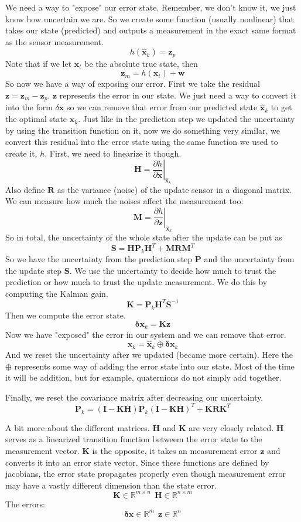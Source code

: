 \documentclass[11pt]{article}
\newcommand{\R}{\mathbb{R}}
\renewcommand{\vec}[1]{\mathbf{#1}}
\renewcommand{\tilde}[1]{\expandafter\hat{#1}}
\newcommand{\mat}[1]{\mathbf{#1}}
\begin{document}
We need a way to "expose" our error state. Remember, we don't know it, we just know how uncertain we are. So we create some function (usually nonlinear) that takes our state (predicted) and outputs a measurement in the exact same format as the sensor measurement.
$$h(\vec{\tilde{x}}_k) = \vec{z}_p$$
Note that if we let $\vec{x}_t$ be the absolute true state, then $$\vec{z}_m = h(\vec{x}_t) + \vec{w}$$
So now we have a way of exposing our error. First we take the residual $\vec{z} = \vec{z}_m - \vec{z}_p$. $\vec{z}$ represents the error in our state. We just need a way to convert it into the form $\delta \vec{x}$ so we can remove that error from our predicted state $\tilde{\vec{x}}_k$ to get the optimal state $\vec{x}_k$. Just like in the prediction step we updated the uncertainty by using the transition function on it, now we do something very similar, we convert this residual into the error state using the same function we used to create it, $h$. First, we need to linearize it though.
$$\mat{H} = \left.\frac{\partial h}{\partial \vec{x}}\right|_{\tilde{\vec{x}}_k}$$
Also define $\mat{R}$ as the variance (noise) of the update sensor in a diagonal matrix. We can measure how much the noises affect the measurement too:
$$\mat{M} = \left.\frac{\partial h}{\partial \vec{z}}\right|_{\tilde{\vec{x}}_k}$$
So in total, the uncertainty of the whole state after the update can be put as
$$ \mat{S} = \mat{H} \mat{P}_k \mat{H}^T + \mat{M} \mat{R} \mat{M}^T$$
So we have the uncertainty from the prediction step $\mat{P}$ and the uncertainty from the update step $\mat{S}$. We use the uncertainty to decide how much to trust the prediction or how much to trust the update measurement. We do this by computing the Kalman gain.\\
$$\mat{K} = \mat{P}_k \mat{H}^T \mat{S}^{-1}$$
Then we compute the error state.
$$\vec{\delta x}_k = \mat{K} \vec{z}$$
Now we have "exposed" the error in our system and we can remove that error.
$$\vec{x}_k = \vec{\tilde{x}}_k \oplus \vec{\delta x}_k$$
And we reset the uncertainty after we updated (became more certain). Here the $\oplus$ represents some way of adding the error state into our state. Most of the time it will be addition, but for example, quaternions do not simply add together.

Finally, we reset the covariance matrix after decreasing our uncertainty.
$$\mat{P}_k  = (\mat{I} -\mat{KH})\mat{P}_k(\mat{I}-\mat{KH})^T + \mat{KRK}^T$$

A bit more about the different matrices. $\mat{H}$ and $\mat{K}$ are very  closely related. $\mat{H}$ serves as a linearized transition function betweem the error state to the measurement vector. $\mat{K}$ is the opposite, it takes an measurement error $\vec{z}$ and converts it into an error state vector. Since these functions are defined by jacobians, the error state propagates properly even though measurement error may have a vastly different dimension than the  state error.
$$\mat{K} \in \R^{m\times n} ~~ \mat{H} \in \R^{n \times m}$$
The errors:
$$\vec{\delta x} \in \R^m ~~ \vec{z} \in \R^n$$
\end{document}
